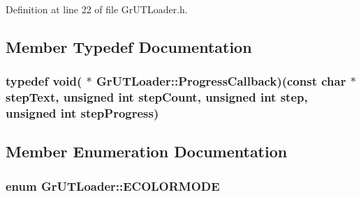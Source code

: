 \begin{CompactItemize}
Definition at line 22 of file GrUTLoader.h.

\subsection{Member Typedef Documentation}
\hypertarget{class_gr_u_t_loader_b2a7be2e554d43ef1a6b4851ef4e0f39}{
\subsubsection[{ProgressCallback}]{\setlength{\rightskip}{0pt plus 5cm}typedef void( $\ast$ {\bf GrUTLoader::ProgressCallback})(const char $\ast$stepText, unsigned int stepCount, unsigned int step, unsigned int stepProgress)}}
\label{class_gr_u_t_loader_b2a7be2e554d43ef1a6b4851ef4e0f39}




\subsection{Member Enumeration Documentation}
\hypertarget{class_gr_u_t_loader_328b8875d7cc411c1ad47f0d9279d8f2}{
\subsubsection[{ECOLORMODE}]{\setlength{\rightskip}{0pt plus 5cm}enum {\bf GrUTLoader::ECOLORMODE}}}
\label{class_gr_u_t_loader_328b8875d7cc411c1ad47f0d9279d8f2}



\end{CompactItemize}
